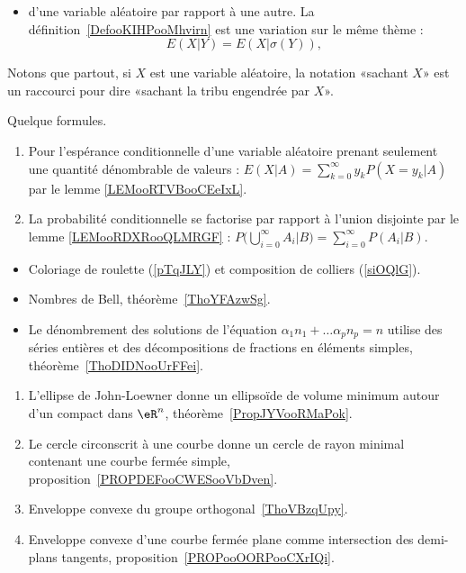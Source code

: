 \begin{description}
\begin{itemize}
    \item d'une variable aléatoire par rapport à une autre. La définition~\ref{DefooKIHPooMhvirn} est une variation sur le même thème :
\begin{equation*}
    E(X|Y)=E(X|\sigma(Y)),
\end{equation*}

        \end{itemize}

\end{description}

Notons que partout, si \( X\) est une variable aléatoire, la notation «sachant \( X\)» est un raccourci pour dire «sachant la tribu engendrée par \( X\)».

Quelque formules.
\begin{enumerate}
    \item
        Pour l'espérance conditionnelle d'une variable aléatoire prenant seulement une quantité dénombrable de valeurs :
        $E(X|A)=\sum_{k=0}^{\infty}y_kP(X=y_k|A)$ par le lemme \ref{LEMooRTVBooCEeIxL}.
    \item
        La probabilité conditionnelle se factorise par rapport à l'union disjointe par le lemme \ref{LEMooRDXRooQLMRGF} : $P\big( \bigcup_{i=0}^{\infty}A_i|B \big)=\sum_{i=0}^{\infty}P(A_i|B)$.
\end{enumerate}

\begin{itemize}
    \item Coloriage de roulette (\ref{pTqJLY}) et composition de colliers (\ref{siOQlG}).
    \item Nombres de Bell, théorème~\ref{ThoYFAzwSg}.
    \item Le dénombrement des solutions de l'équation \( \alpha_1 n_1+\ldots \alpha_pn_p=n\) utilise des séries entières et des décompositions de fractions en éléments simples, théorème~\ref{ThoDIDNooUrFFei}.
\end{itemize}


    \begin{enumerate}
        \item
            L'ellipse de John-Loewner donne un ellipsoïde de volume minimum autour d'un compact dans \( \eR^n\), théorème~\ref{PropJYVooRMaPok}.
        \item
            Le cercle circonscrit à une courbe donne un cercle de rayon minimal contenant une courbe fermée simple, proposition~\ref{PROPDEFooCWESooVbDven}.
    \item Enveloppe convexe du groupe orthogonal~\ref{ThoVBzqUpy}.
    \item Enveloppe convexe d'une courbe fermée plane comme intersection des demi-plans tangents, proposition~\ref{PROPooOORPooCXrIQi}.
        \end{enumerate}


